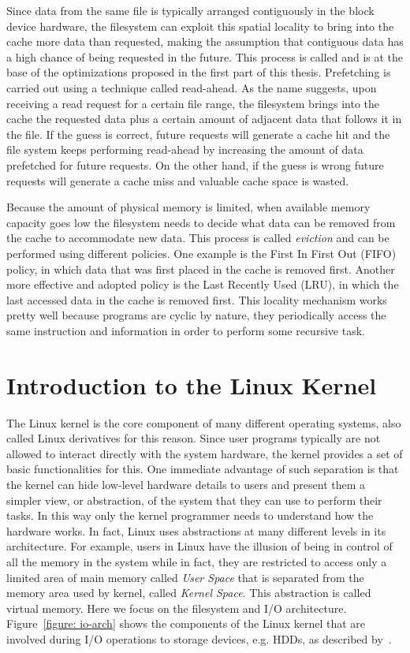 Since data from the same file is typically arranged contiguously in the block device hardware, the filesystem can exploit this spatial locality to bring into the cache more data than requested,
making the assumption that contiguous data has a high chance of being requested in the future. This process is called  and is at the base of the optimizations proposed in 
the first part of this thesis. Prefetching is carried out using a technique called read-ahead. As the name suggests, upon receiving a read request for a certain file range, the filesystem 
brings into the cache the requested data plus a certain amount of adjacent data that follows it in the file. If the guess is correct, future requests will generate a cache hit and  the file 
system keeps performing read-ahead by increasing the amount of data prefetched for future requests. On the other hand, if the guess is wrong future requests will generate a cache miss and 
valuable cache space is wasted.

Because the amount of physical memory is limited, when available memory capacity goes low the filesystem needs to decide what data can be removed from the cache to accommodate new data. This 
process is called \textit{eviction} and can be performed using different policies. One example is the First In First Out (FIFO) policy, in which data that was first placed in the cache is 
removed first. Another more effective and adopted policy is the Last Recently Used (LRU), in which the last accessed data in the cache is removed first. This locality mechanism works pretty 
well because programs are cyclic by nature, they periodically access the same instruction and information in order to perform some recursive task.

\section{Introduction to the Linux Kernel} \label{sec:kern-arch}
The Linux kernel is the core component of many different operating systems, also called Linux derivatives for this reason. Since user programs typically are not allowed to interact directly
with the system hardware, the kernel provides a set of basic functionalities for this. One immediate advantage of such separation is that the kernel can hide low-level hardware details to 
users and present them a simpler view, or abstraction, of the system that they can use to perform their tasks. In this way only the kernel programmer needs to understand how the 
hardware works. In fact, Linux uses abstractions at many different levels in its architecture. For example, users in Linux have the illusion of being in control of all the memory in the system 
while in fact, they are restricted to access only a limited area of main memory called \textit{User Space} that is separated from the memory area used by kernel, called \textit{Kernel Space}. 
This abstraction is called virtual memory. Here we focus on the filesystem and I/O architecture. Figure~\ref{figure: io-arch} shows the components of the Linux kernel that are involved during 
I/O operations to storage devices, e.g. HDDs, as described by~\cite{Cesati}.

